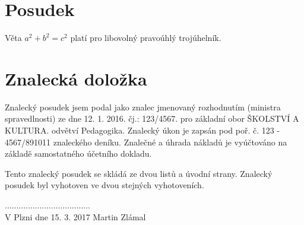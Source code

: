 \section*{Posudek}
Věta $a^2+b^2=c^2$ platí pro libovolný pravoúhlý trojúhelník.

\section*{Znalecká doložka}
Znalecký posudek jsem podal jako znalec jmenovaný rozhodnutím (ministra spravedlnosti) ze dne 12. 1. 2016. čj.: 123/4567. pro základní obor ŠKOLSTVÍ A KULTURA. odvětví Pedagogika. Znalecký úkon je zapsán pod poř. č. 123 - 4567/891011 znaleckého deníku. Znalečné a úhrada nákladů je vyúčtováno na základě samostatného účetního dokladu.

\vspace{0.5cm}
\noindent
Tento znalecký posudek se skládá ze dvou listů a úvodní strany. Znalecký posudek byl vyhotoven ve dvou stejných vyhotoveních.

\vspace{5cm}
\hfill .....................................\\
V Plzni dne 15. 3. 2017 \hfill Martin Zlámal
